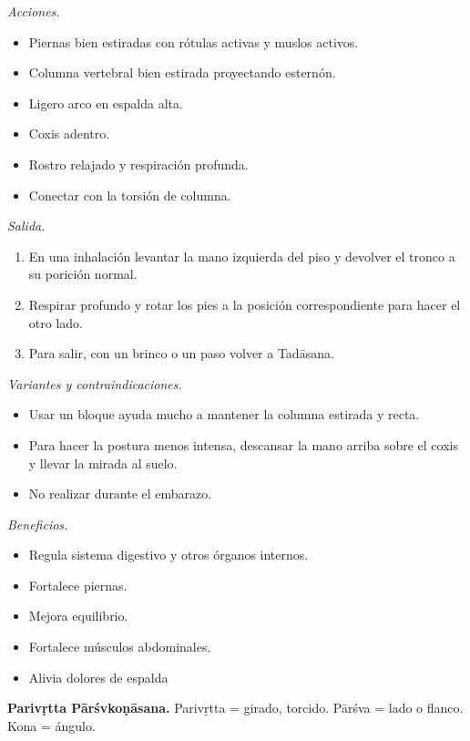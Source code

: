 \emph{Acciones.}
\begin{itemize}
\item Piernas bien estiradas con rótulas
activas y muslos activos.
\item Columna vertebral bien estirada
proyectando esternón.
\item Ligero arco en espalda alta.
\item Coxis adentro.
\item Rostro relajado y respiración profunda.
\item Conectar con la torsión de columna.
\end{itemize}

\emph{Salida.}
\begin{enumerate}
\item En una inhalación levantar la mano
izquierda del piso y devolver el tronco a su
porición normal.
\item Respirar profundo y rotar los pies a la
posición correspondiente para hacer el otro
lado.
\item Para salir, con un brinco o un paso
volver a Tadāsana.
\end{enumerate}

\emph{Variantes y contraindicaciones.}
\begin{itemize}
\item Usar un bloque ayuda mucho a mantener
la columna estirada y recta.
\item Para hacer la postura menos intensa,
descansar la mano arriba sobre el coxis y
llevar la mirada al suelo.
\item No realizar durante el embarazo.
\end{itemize}

\emph{Beneficios.}
\begin{itemize}
\item Regula sistema digestivo y otros
órganos internos.
\item Fortalece piernas.
\item Mejora equilibrio.
\item Fortalece músculos abdominales.
\item Alivia dolores de espalda
\end{itemize}

\medskip\noindent\textbf{Parivṛtta
Pārśvkoṇāsana.}
Parivṛtta = girado, torcido. Pārśva = lado o
flanco. Kona = ángulo.

